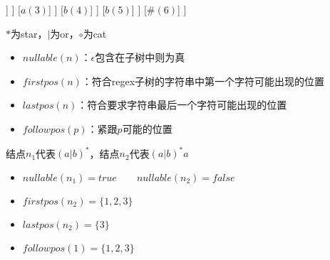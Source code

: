 \begin{minipage}{0.25\linewidth}
\begin{forest}
[$\circ$
	[$\circ$
		[$\circ$
			[$\circ(n_2)$
				[$*(n_1)$
					[$|$
						[$a(1)$]
						[$b(2)$]
					]
				]
				[$a(3)$]
			]
			[$b(4)$]
		]
		[$b(5)$]
	]
	[$\#(6)$]
]
\end{forest}
\end{minipage}
\begin{minipage}{0.75\linewidth}
$*$为star，$|$为or，$\circ$为cat
\begin{itemize}
	\item $nullable(n)$：$\epsilon$包含在子树中则为真
	\item $firstpos(n)$：符合regex子树的字符串中第一个字符可能出现的位置
	\item $lastpos(n)$：符合要求字符串最后一个字符可能出现的位置
	\item $followpos(p)$：紧跟$p$可能的位置
\end{itemize}
\begin{example}
结点$n_1$代表$(a|b)^*$，结点$n_2$代表$(a|b)^*a$
\begin{itemize}
	\item $nullable(n_1)=true\qquad nullable(n_2)=false$
	\item $firstpos(n_2)=\{1,2,3\}$
	\item $lastpos(n_2)=\{3\}$
	\item $followpos(1)=\{1,2,3\}$
\end{itemize}
\end{example}
\end{minipage}

